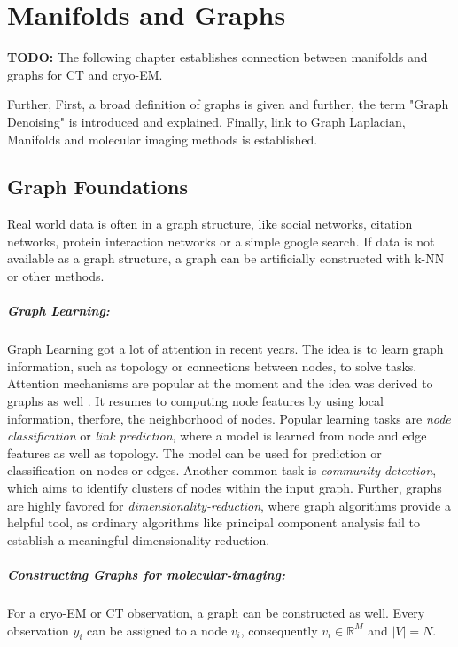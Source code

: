 \chapter{Manifolds and Graphs}
\label{sec:manifold_and_graphs}
    
\textbf{TODO:}
The following chapter establishes connection between manifolds and graphs 
for CT and cryo-EM. 

Further, 
First, a broad definition of graphs is given and further, the term "Graph Denoising" is
introduced and explained. Finally, link to Graph Laplacian, Manifolds and molecular imaging methods is established.

\section{Graph Foundations}
Real world data is often in a graph structure, like social networks, citation networks,
protein interaction networks or a simple google search. 
If data is not available as a graph structure, a graph can be artificially constructed with k-NN or other methods.

\paragraph{Graph Learning:} 

Graph Learning got a lot of attention in recent years.
The idea is to learn graph information, such as topology or connections between nodes, to solve tasks.
Attention mechanisms are popular at the moment\cite{transformer} and the idea was derived to graphs as well \cite{GAT}.
It resumes to computing node features by using local information, therfore, the neighborhood of nodes.
Popular learning tasks are \textit{node classification} or \textit{link prediction}, where a model is learned from node and edge features 
as well as topology. The model can be used for prediction or classification on nodes or edges.
Another common task is \textit{community detection}, which aims to identify clusters of nodes within the input graph.
Further, graphs are highly favored for \textit{dimensionality-reduction}, where 
graph algorithms provide a helpful tool, as ordinary algorithms like principal component analysis fail to 
establish a meaningful dimensionality reduction.


\paragraph{Constructing Graphs for molecular-imaging:}
For a cryo-EM or CT observation, a graph can be constructed as well.
Every observation $y_i$ can be assigned to a node $v_i$, consequently $v_i \in \mathbb{R}^M$ and $|V|=N$.

